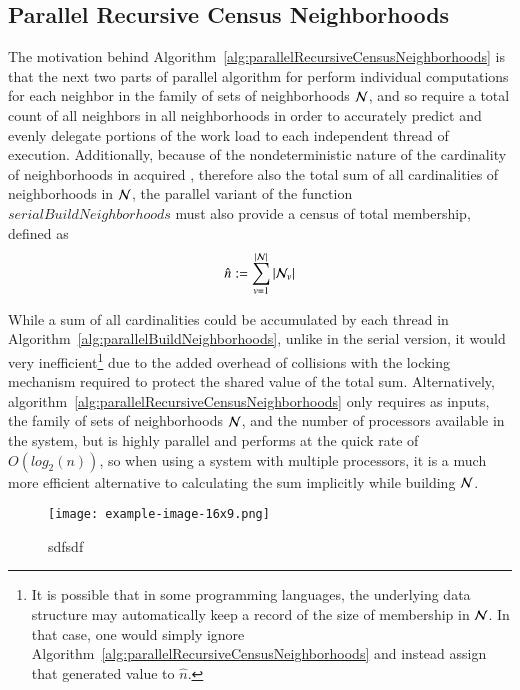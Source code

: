 %
%
\subsection{Parallel Recursive Census Neighborhoods}
\label{ch5sBNPssPRCN}
The motivation behind Algorithm~\ref{alg:parallelRecursiveCensusNeighborhoods} is that the next two parts of parallel algorithm for  perform individual computations for each neighbor in the family of sets of neighborhoods $\mathcal{N}$, and so require a total count of all neighbors in all neighborhoods in order to accurately predict and evenly delegate portions of the work load to each independent thread of execution. Additionally, because of the nondeterministic nature of the cardinality of neighborhoods in acquired \tdd{}, therefore also the total sum of all cardinalities of neighborhoods in $\mathcal{N}$, the parallel variant of the function $\mathit{serialBuildNeighborhoods}$ must also provide a census of total membership, defined as
%
\begin{equation}
	\hat{n} := \sum\limits_{v=1}^{|\mathcal{N}|}{|\mathcal{N}_v|}
	\label{eq:censusNeighborhoods}
\end{equation}%
%

While a sum of all cardinalities could be accumulated by each thread in  Algorithm~\ref{alg:parallelBuildNeighborhoods}, unlike in the serial version, it would very inefficient\footnote{It is possible that in some programming languages, the underlying data structure may automatically keep a record of the size of membership in $\mathcal{N}$. In that case, one would simply ignore Algorithm~\ref{alg:parallelRecursiveCensusNeighborhoods} and instead assign that generated value to $\hat{n}$.} due to the added overhead of collisions with the locking mechanism required to protect the shared value of the total sum.  Alternatively, algorithm~\ref{alg:parallelRecursiveCensusNeighborhoods} only requires as inputs, the family of sets of neighborhoods $\mathcal{N}$, and the number of processors available in the system, but is highly parallel and performs at the quick rate of $O(log_2(n))$, so when using a system with multiple processors, it is a much more efficient alternative to calculating the sum implicitly while building $\mathcal{N}$.

\begin{figure}[ht]
	{\texttt{[image: example-image-16x9.png]}}
	{\caption[wefwefwef]{sdfsdf}\label{fig:wfwef}}
\end{figure}

